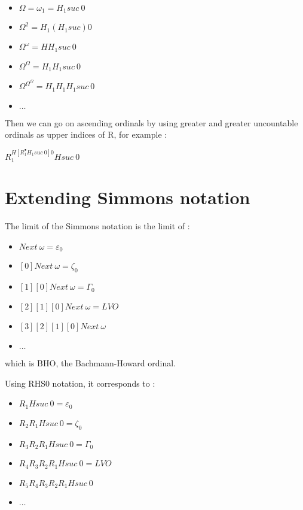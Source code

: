 \documentclass[10pt]{article}
\begin{document}
\begin{itemize}
     \setlength{\itemsep}{1pt}
     \setlength{\parskip}{0pt}
     \setlength{\parsep}{0pt}
\item \( \Omega = \omega_1 = H_1 suc\ 0 \)
\item \( \Omega^2 = H_1 (H_1 suc) 0 \)
\item \( \Omega^\omega = H H_1 suc\ 0 \)
\item \( \Omega^\Omega = H_1 H_1 suc\ 0 \)
\item \( \Omega^{\Omega^\Omega} = H_1 H_1 H_1 suc\ 0 \)
\item \( \ldots \)
\end{itemize}

Then we can go on ascending ordinals by using greater and greater uncountable ordinals as upper indices of R, for example :

\( R^{H [R^\bullet_1 H_1 suc\ 0] 0}_1 H suc\ 0 \)

\bigskip

\section{Extending Simmons notation}

The limit of the Simmons notation is the limit of :

\begin{itemize}
     \setlength{\itemsep}{1pt}
     \setlength{\parskip}{0pt}
     \setlength{\parsep}{0pt}
\item \( Next\ \omega = \varepsilon_0 \)
\item \( [0] Next\ \omega = \zeta_0 \)
\item \( [1] [0] Next\ \omega = \Gamma_0 \)
\item \( [2] [1] [0] Next\ \omega = LVO \)
\item \( [3] [2] [1] [0] Next\ \omega \)
\item \( \ldots \)
\end{itemize}

which is BHO, the Bachmann-Howard ordinal.

Using RHS0 notation, it corresponds to :

\begin{itemize}
     \setlength{\itemsep}{1pt}
     \setlength{\parskip}{0pt}
     \setlength{\parsep}{0pt}
\item \( R_1 H suc\ 0 = \varepsilon_0 \)
\item \( R_2 R_1 H suc\ 0 = \zeta_0 \)
\item \( R_3 R_2 R_1 H suc\ 0 = \Gamma_0 \)
\item \( R_4 R_3 R_2 R_1 H suc\ 0 = LVO \)
\item \( R_5 R_4 R_3 R_2 R_1 H suc\ 0 \)
\item \( \ldots \)
\end{itemize}
\end{document}
